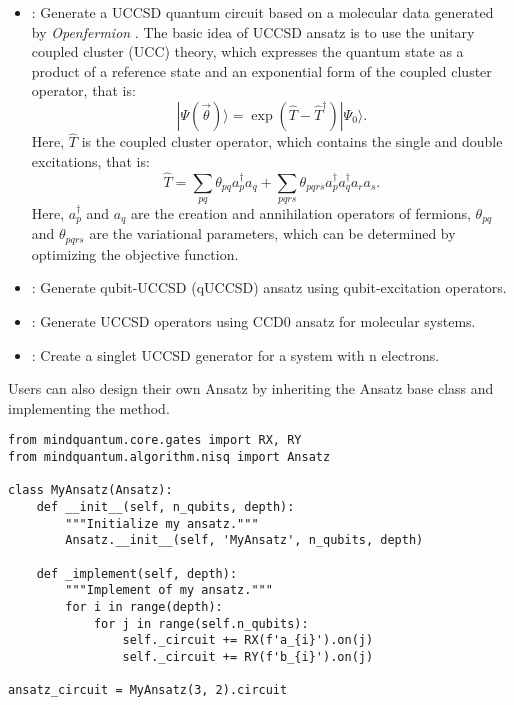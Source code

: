 \begin{itemize}
    \item \generateuccsd: Generate a UCCSD quantum circuit based on a molecular data generated by \textit{Openfermion} \cite{mcclean2020openfermion}. The basic idea of UCCSD ansatz is to use the unitary coupled cluster (UCC) theory, which expresses the quantum state as a product of a reference state and an exponential form of the coupled cluster operator, that is:
          $$
              |\Psi(\vec{\theta})\rangle = \exp(\hat{T} - \hat{T}^\dagger)|\Psi_0\rangle.
          $$
          Here, $\hat{T}$ is the coupled cluster operator, which contains the single and double excitations, that is:
          $$
              \hat{T} = \sum_{pq}\theta_{pq}a_p^\dagger a_q + \sum_{pqrs}\theta_{pqrs}a_p^\dagger a_q^\dagger a_r a_s.
          $$
          Here, $a_p^\dagger$ and $a_q$ are the creation and annihilation operators of fermions, $\theta_{pq}$ and $\theta_{pqrs}$ are the variational parameters, which can be determined by optimizing the objective function.

    \item \quccsdgenerator: Generate qubit-UCCSD (qUCCSD) ansatz using qubit-excitation operators.
    \item \uccsdzerosingletgenerator: Generate UCCSD operators using CCD0 ansatz for molecular systems.
    \item \uccsdsingletgenerator: Create a singlet UCCSD generator for a system with n electrons.
\end{itemize}

Users can also design their own Ansatz by inheriting the Ansatz base class and implementing the  method.

\begin{lstlisting}
from mindquantum.core.gates import RX, RY
from mindquantum.algorithm.nisq import Ansatz

class MyAnsatz(Ansatz):
    def __init__(self, n_qubits, depth):
        """Initialize my ansatz."""
        Ansatz.__init__(self, 'MyAnsatz', n_qubits, depth)

    def _implement(self, depth):
        """Implement of my ansatz."""
        for i in range(depth):
            for j in range(self.n_qubits):
                self._circuit += RX(f'a_{i}').on(j)
                self._circuit += RY(f'b_{i}').on(j)

ansatz_circuit = MyAnsatz(3, 2).circuit
\end{lstlisting}